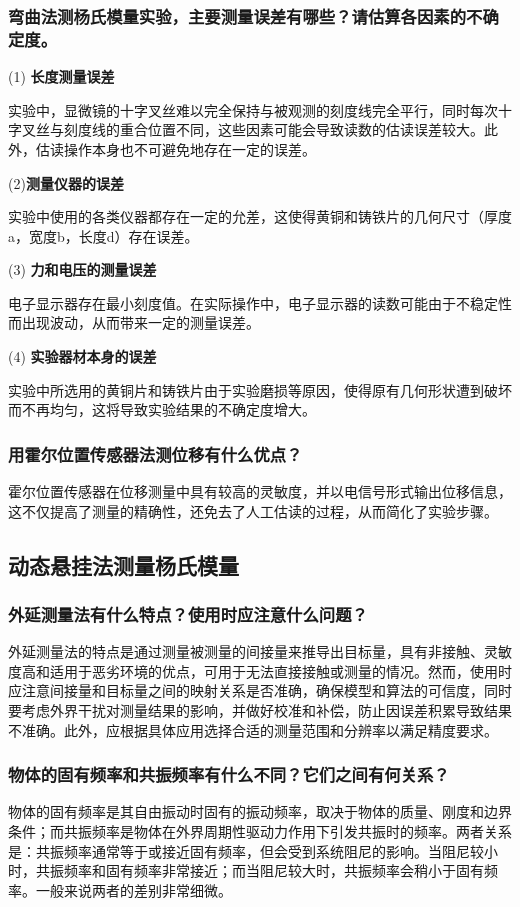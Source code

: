 \documentclass[UTF-8,twoside,cs4size]{ctexart}
\begin{document}
\subsubsection{弯曲法测杨氏模量实验，主要测量误差有哪些？请估算各因素的不确定度。}
(1) \textbf{长度测量误差} \par
实验中，显微镜的十字叉丝难以完全保持与被观测的刻度线完全平行，同时每次十字叉丝与刻度线的重合位置不同，这些因素可能会导致读数的估读误差较大。此外，估读操作本身也不可避免地存在一定的误差。 \par
(2)\textbf{测量仪器的误差} \par
实验中使用的各类仪器都存在一定的允差，这使得黄铜和铸铁片的几何尺寸（厚度a，宽度b，长度d）存在误差。 \par
(3) \textbf{力和电压的测量误差} \par
电子显示器存在最小刻度值。在实际操作中，电子显示器的读数可能由于不稳定性而出现波动，从而带来一定的测量误差。 \par
(4) \textbf{实验器材本身的误差} \par
实验中所选用的黄铜片和铸铁片由于实验磨损等原因，使得原有几何形状遭到破坏而不再均匀，这将导致实验结果的不确定度增大。 \par
\subsubsection{用霍尔位置传感器法测位移有什么优点？}
霍尔位置传感器在位移测量中具有较高的灵敏度，并以电信号形式输出位移信息，这不仅提高了测量的精确性，还免去了人工估读的过程，从而简化了实验步骤。
\subsection{动态悬挂法测量杨氏模量}
\subsubsection{外延测量法有什么特点？使用时应注意什么问题？}
外延测量法的特点是通过测量被测量的间接量来推导出目标量，具有非接触、灵敏度高和适用于恶劣环境的优点，可用于无法直接接触或测量的情况。然而，使用时应注意间接量和目标量之间的映射关系是否准确，确保模型和算法的可信度，同时要考虑外界干扰对测量结果的影响，并做好校准和补偿，防止因误差积累导致结果不准确。此外，应根据具体应用选择合适的测量范围和分辨率以满足精度要求。
\subsubsection{物体的固有频率和共振频率有什么不同？它们之间有何关系？}
物体的固有频率是其自由振动时固有的振动频率，取决于物体的质量、刚度和边界条件；而共振频率是物体在外界周期性驱动力作用下引发共振时的频率。两者关系是：共振频率通常等于或接近固有频率，但会受到系统阻尼的影响。当阻尼较小时，共振频率和固有频率非常接近；而当阻尼较大时，共振频率会稍小于固有频率。一般来说两者的差别非常细微。
\end{document}
